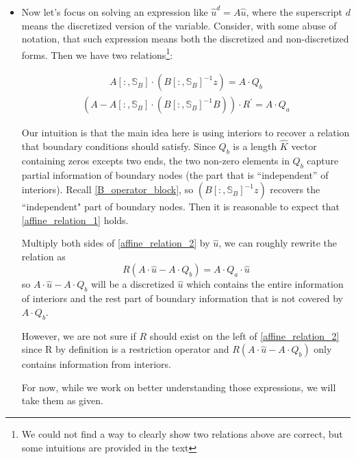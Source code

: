 \documentclass[11pt]{article}
\begin{document}
		\begin{itemize}
			\item Now let's focus on solving an expression like $\hat{u}^d = A \hat{u}$, where the superscript $d$ means the discretized version of the variable. Consider, with some abuse of notation, that such expression means both the discretized and non-discretized forms. Then we have two relations\footnote{We could not find a way to clearly show two relations above are correct, but some intuitions are provided in the text}:
		
			\begin{align}
			A[:,\mathbb{S}_B] \cdot\left(B[:,\mathbb{S}_B]^{-1} z \right) = A\cdot Q_b\label{affine_relation_1}
			\end{align}
			\begin{align}
			(A-A[:,\mathbb{S}_B] \cdot(B[:,\mathbb{S}_B]^{-1} B))\cdot R^{'} = A\cdot Q_a\label{affine_relation_2}
			\end{align}		
		
			Our intuition is that the main idea here is using interiors to recover a relation that boundary conditions should satisfy. Since $Q_b$ is a length $\hat{K}$ vector containing zeros excepts two ends, the two non-zero elements in $Q_b$ capture partial information of boundary nodes (the part that is ``independent'' of interiors).  Recall \eqref{B_operator_block}, so $\left(B[:,\mathbb{S}_B]^{-1} z \right)$ recovers the ``independent" part of boundary nodes. Then it is reasonable to expect that \eqref{affine_relation_1} holds.
		
			Multiply both sides of \eqref{affine_relation_2} by $\hat{u}$, we can roughly rewrite the relation as
			\begin{equation}
			R(A\cdot \hat{u}-A\cdot Q_b) = A\cdot Q_a\cdot \hat{u}
			\end{equation}
			so $A\cdot \hat{u}-A\cdot Q_b$ will be a discretized $\hat{u}$ which contains the entire information of interiors and the rest part of boundary information that is not covered by $A\cdot Q_b$. 
		
			However, we are not sure if $R$ should exist on the left of \eqref{affine_relation_2} since R by definition is a restriction operator and $R(A\cdot \hat{u}-A\cdot Q_b)$ only contains information from interiors.
			\iffalse %
			Also the size of the LHS of \eqref{affine_relation_2} is $K\times \hat{K}$, but the size of the RHS is $\hat{I}\times I$ .
			\fi
			For now, while we work on better understanding those expressions, we will take them as given.
		

\end{itemize}
\end{document}
